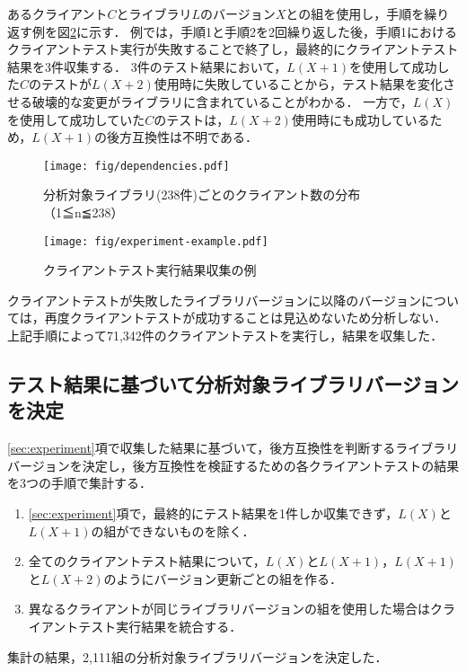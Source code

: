 \documentclass[submit]{ipsj}
\begin{document}
あるクライアント$C$とライブラリ$L$のバージョン$X$との組を使用し，手順を繰り返す例を図\ref{fig:experimentExample}に示す．
例では，手順1と手順2を2回繰り返した後，手順1におけるクライアントテスト実行が失敗することで終了し，最終的にクライアントテスト結果を3件収集する．
3件のテスト結果において，$L(X+1)$を使用して成功した$C$のテストが$L(X+2)$使用時に失敗していることから，テスト結果を変化させる破壊的な変更がライブラリに含まれていることがわかる．
一方で，$L(X)$を使用して成功していた$C$のテストは，$L(X+2)$使用時にも成功しているため，$L(X+1)$の後方互換性は不明である．

\begin{figure}
  \centering
  \texttt{[image: fig/dependencies.pdf]}
  \caption{分析対象ライブラリ(238件)ごとのクライアント数の分布（1≦n≦238）}
  \label{fig:dependencies}
\end{figure}

\begin{figure}
  \centering
  \texttt{[image: fig/experiment-example.pdf]}
  \caption{クライアントテスト実行結果収集の例}
  \label{fig:experimentExample}
\end{figure}

クライアントテストが失敗したライブラリバージョンに以降のバージョンについては，再度クライアントテストが成功することは見込めないため分析しない．
上記手順によって71,342件のクライアントテストを実行し，結果を収集した．

\subsection{テスト結果に基づいて分析対象ライブラリバージョンを決定}
\ref{sec:experiment}項で収集した結果に基づいて，後方互換性を判断するライブラリバージョンを決定し，後方互換性を検証するための各クライアントテストの結果を3つの手順で集計する．

\begin{enumerate}
  \item \ref{sec:experiment}項で，最終的にテスト結果を1件しか収集できず，$L(X)$と$L(X+1)$の組ができないものを除く．
  \item 全てのクライアントテスト結果について，$L(X)$と$L(X+1)$，$L(X+1)$と$L(X+2)$のようにバージョン更新ごとの組を作る．
  \item 異なるクライアントが同じライブラリバージョンの組を使用した場合はクライアントテスト実行結果を統合する．
\end{enumerate}

集計の結果，2,111組の分析対象ライブラリバージョンを決定した．
\end{document}
